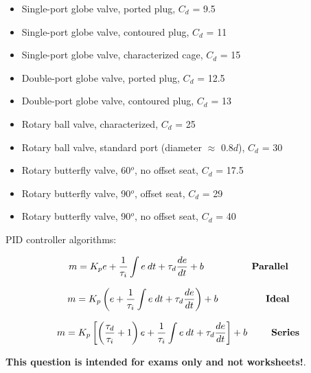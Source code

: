 \begin{itemize}
\item{} Single-port globe valve, ported plug, $C_d$ = 9.5
\item{} Single-port globe valve, contoured plug, $C_d$ = 11
\item{} Single-port globe valve, characterized cage, $C_d$ = 15
\item{} Double-port globe valve, ported plug, $C_d$ = 12.5
\item{} Double-port globe valve, contoured plug, $C_d$ = 13
\item{} Rotary ball valve, characterized, $C_d$ = 25
\item{} Rotary ball valve, standard port (diameter $\approx$ 0.8$d$), $C_d$ = 30
\item{} Rotary butterfly valve, 60$^{o}$, no offset seat, $C_d$ = 17.5
\item{} Rotary butterfly valve, 90$^{o}$, offset seat, $C_d$ = 29
\item{} Rotary butterfly valve, 90$^{o}$, no offset seat, $C_d$ = 40
\end{itemize}

\filbreak

PID controller algorithms:

$$m = K_p e + {1 \over \tau_i} \int e \> dt + \tau_d {de \over dt} + b \hbox{\hskip 50pt {\bf Parallel}}$$

\vskip 30pt

$$m = K_p \left( e + {1 \over \tau_i} \int e \> dt + \tau_d {de \over dt} \right) + b \hbox{\hskip 50pt {\bf Ideal}}$$

\vskip 30pt

$$m = K_p \left[ \left({\tau_d \over \tau_i} + 1 \right) e + {1 \over \tau_i} \int e \> dt + \tau_d {de \over dt} \right] + b \hbox{\hskip 25pt {\bf Series}}$$















{\bf This question is intended for exams only and not worksheets!}.




